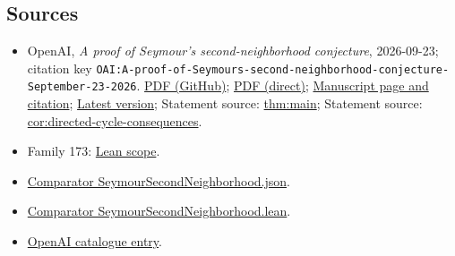\documentclass[11pt]{article}
\begin{document}
\subsection{Sources}
\begin{itemize}
\item OpenAI, \emph{A proof of Seymour's second-neighborhood conjecture}, 2026-09-23; citation key \texttt{OAI:A-proof-of-Seymours-second-neighborhood-conjecture-September-23-2026}. \href{https://github.com/openai/math/blob/adc7f1241b42e322a6451854ab7e4b4c146bf78a/preprints/A-proof-of-Seymours-second-neighborhood-conjecture-September-23-2026/paper.pdf}{PDF (GitHub)}; \href{https://github.com/openai/math/raw/adc7f1241b42e322a6451854ab7e4b4c146bf78a/preprints/A-proof-of-Seymours-second-neighborhood-conjecture-September-23-2026/paper.pdf}{PDF (direct)}; \href{https://github.com/openai/math/blob/adc7f1241b42e322a6451854ab7e4b4c146bf78a/preprints/A-proof-of-Seymours-second-neighborhood-conjecture-September-23-2026/README.md}{Manuscript page and citation}; \href{https://github.com/openai/math/blob/main/preprints/A-proof-of-Seymours-second-neighborhood-conjecture-September-23-2026/paper.pdf}{Latest version}; Statement source: \href{https://github.com/openai/math/blob/adc7f1241b42e322a6451854ab7e4b4c146bf78a/preprints/A-proof-of-Seymours-second-neighborhood-conjecture-September-23-2026/build/source/00-introduction.tex\#L16}{thm:main}; Statement source: \href{https://github.com/openai/math/blob/adc7f1241b42e322a6451854ab7e4b4c146bf78a/preprints/A-proof-of-Seymours-second-neighborhood-conjecture-September-23-2026/build/source/05-directed-cycle-consequences.tex\#L15}{cor:directed-cycle-consequences}.
\item Family 173: \href{https://github.com/openai/math/blob/adc7f1241b42e322a6451854ab7e4b4c146bf78a/lean/docs/173.md}{Lean scope}.
\item \href{https://github.com/openai/math/blob/adc7f1241b42e322a6451854ab7e4b4c146bf78a/lean/ComparatorChallenges/SeymourSecondNeighborhood.json}{Comparator SeymourSecondNeighborhood.json}.
\item \href{https://github.com/openai/math/blob/adc7f1241b42e322a6451854ab7e4b4c146bf78a/lean/ComparatorChallenges/SeymourSecondNeighborhood.lean}{Comparator SeymourSecondNeighborhood.lean}.
\item \href{https://github.com/openai/math/blob/adc7f1241b42e322a6451854ab7e4b4c146bf78a/CONTENTS.md}{OpenAI catalogue entry}.
\end{itemize}
\end{document}

